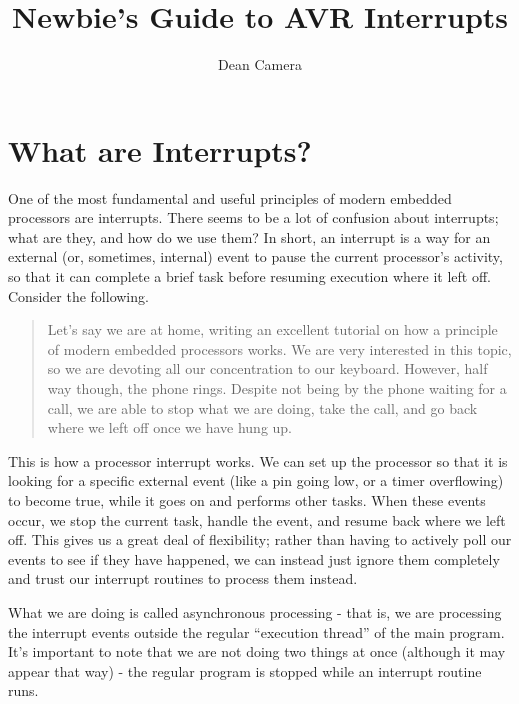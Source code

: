 \documentclass[a4paper,oneside,notitlepage]{book}
\begin{document}
\title{Newbie's Guide to AVR Interrupts}
\author{Dean Camera}

\maketitle

\tableofcontents
\cleardoublepage


\chapter{What are Interrupts?}
\label{chp:WhatAreInts}

One of the most fundamental and useful principles of modern embedded processors are interrupts. There seems to be a lot of confusion about interrupts; what are they, and how do we use them? In short, an interrupt is a way for an external (or, sometimes, internal) event to pause the current processor's activity, so that it can complete a brief task before resuming execution where it left off. Consider the following.

\begin{quote}
Let's say we are at home, writing an excellent tutorial on how a principle of modern embedded processors works. We are very interested in this topic, so we are devoting all our concentration to our keyboard. However, half way though, the phone rings. Despite not being by the phone waiting for a call, we are able to stop what we are doing, take the call, and go back where we left off once we have hung up.
\end{quote}

This is how a processor interrupt works. We can set up the processor so that it is looking for a specific external event (like a pin going low, or a timer overflowing) to become true, while it goes on and performs other tasks. When these events occur, we stop the current task, handle the event, and resume back where we left off. This gives us a great deal of flexibility; rather than having to actively poll our events to see if they have happened, we can instead just ignore them completely and trust our interrupt routines to process them instead.

What we are doing is called asynchronous processing - that is, we are processing the interrupt events outside the regular ``execution thread'' of the main program. It's important to note that we are not doing two things at once (although it may appear that way) - the regular program is stopped while an interrupt routine runs.
\end{document}
